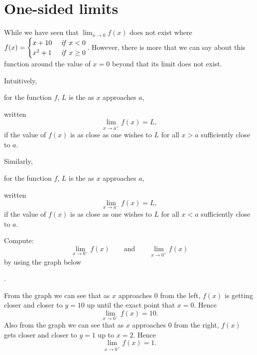 \documentclass{ximera}
\begin{document}
\section{One-sided limits}


While we have seen that $\lim_{x\to 0}f(x)$ does not
exist where $f(x)=\begin{cases} x+10 & \mbox{ \emph{if} }x<0\\x^2+1 & \mbox{ \emph{if} } x\geq 0\end{cases}$. However, there is more that we can say about this function around the value of $x=0$ beyond that its limit does not exist.



\begin{definition}
  Intuitively,

   for the function $f$,  $L$ is the  as $x$ approaches $a$,

  written
  \[
  \lim_{x\to a^+} f(x) = L,
  \]
  if the value of $f(x)$ is as close as one wishes to $L$ for
  all $x>a$ sufficiently close to $a$.
  
  Similarly,


   for  the function $f$, $L$ is the  as $x$ approaches $a$,
  

  written
  \[
  \lim_{x\to a^-} f(x) = L,
  \]
  if the value of $f(x)$ is as close as one wishes to $L$ for
  all $x<a$ sufficiently close to $a$.

\end{definition}


\begin{example}
Compute:
\[
\lim_{x\to 0^-} f(x)\qquad\text{and}\qquad \lim_{x\to 0^+} f(x)
\]
by using the graph below
\begin{image}
.
\end{image}
\begin{explanation}
  From the graph we can see that as $x$ approaches $0$ from the left, $f(x)$ is getting closer and closer to $y=10$ up  until the exact point that $x=0$. Hence
  \[
  \lim_{x\to 0^-} f(x)=10.
  \]
  Also from the graph we can see that as $x$ approaches $0$ from the
  right, $f(x)$ gets closer and closer to $y=1$ up to $x=2$. Hence
  \[
  \lim_{x\to 0^+} f(x)=1.
  \]
\end{explanation}
\end{example}
\end{document}
